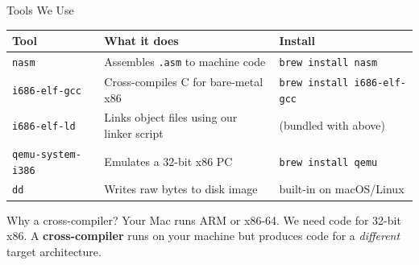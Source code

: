 \documentclass[aspectratio=169]{beamer}
\newcommand{\concept}[2]{%
  \begin{block}{#1}\smallskip #2\smallskip\end{block}\vspace{5pt}}
\begin{document}
\begin{frame}{Tools We Use}
  \begin{tabular}{lll}
    \toprule
    \textbf{Tool} & \textbf{What it does} & \textbf{Install}\\
    \midrule
    \texttt{nasm}         & Assembles \texttt{.asm} to machine code     & \texttt{brew install nasm}\\
    \texttt{i686-elf-gcc} & Cross-compiles C for bare-metal x86         & \texttt{brew install i686-elf-gcc}\\
    \texttt{i686-elf-ld}  & Links object files using our linker script  & (bundled with above)\\
    \texttt{qemu-system-i386}& Emulates a 32-bit x86 PC               & \texttt{brew install qemu}\\
    \texttt{dd}           & Writes raw bytes to disk image              & built-in on macOS/Linux\\
    \bottomrule
  \end{tabular}
  \vspace{8pt}
  \concept{Why a cross-compiler?}{
    Your Mac runs ARM or x86-64. We need code for 32-bit x86. A \textbf{cross-compiler} runs on your machine but produces code for a \emph{different} target architecture.
  }
\end{frame}
\end{document}
